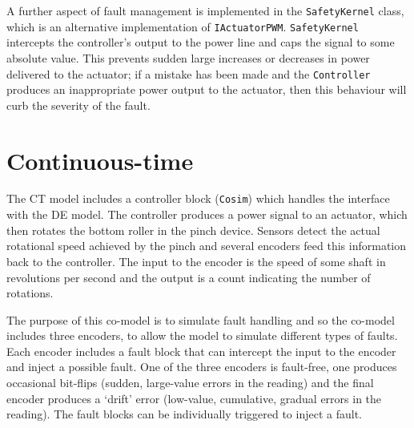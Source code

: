 A further aspect of fault management is implemented in the
\texttt{SafetyKernel} class, which is an alternative implementation of
\texttt{IActuatorPWM}. \texttt{SafetyKernel} intercepts the
controller's output to the power line and caps the signal to some
absolute value.  This prevents sudden large increases or decreases in
power delivered to the actuator; if a mistake has been made and the
\texttt{Controller} produces an inappropriate power output to the
actuator, then this behaviour will curb the severity of the fault.

\section{Continuous-time} \label{sec:CTpinch}
The CT model includes a controller block (\texttt{Cosim}) which
handles the interface with the DE model. The controller produces a
power signal to an actuator, which then rotates the bottom roller in
the pinch device. Sensors detect the actual rotational speed achieved
by the pinch and several encoders feed this information back to the
controller.  The input to the encoder is the speed of some shaft in
revolutions per second and the output is a count indicating the number
of rotations.

The purpose of this co-model is to simulate fault handling and so the
co-model includes three encoders, to allow the model to simulate
different types of faults. Each encoder includes a fault block that
can intercept the input to the encoder and inject a possible
fault. One of the three encoders is fault-free, one produces
occasional bit-flips (sudden, large-value errors in the reading) and
the final encoder produces a `drift' error (low-value, cumulative,
gradual errors in the reading).  The fault blocks can be individually
triggered to inject a fault.


